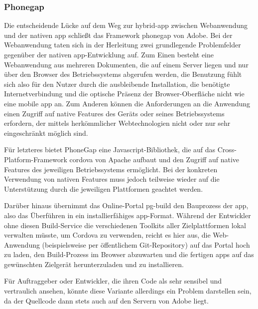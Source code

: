 \subsubsection{Phonegap}
Die entscheidende Lücke auf dem Weg zur \gls{hybrid-app} zwischen Webanwendung und der nativen \gls{app} schließt das Framework \gls{phonegap} von Adobe. 
Bei der Webanwendung taten sich in der Herleitung zwei grundlegende Problemfelder gegenüber der nativen \gls{app}-Entwicklung auf. 
Zum Einen besteht eine Webanwendung aus mehreren Dokumenten, die auf einem Server liegen und nur über den Browser des Betriebssystems abgerufen werden, die Benutzung fühlt sich also für den Nutzer durch die ausbleibende Installation, die benötigte Internetverbindung und die optische Präsenz der Browser-Oberfläche nicht wie eine mobile \gls{app} an. 
Zum Anderen können die Anforderungen an die Anwendung einen Zugriff auf native Features des Geräts oder seines Betriebssystems erfordern, der mittels herkömmlicher Webtechnologien nicht oder nur sehr eingeschränkt möglich sind. 

Für letzteres bietet PhoneGap eine Javascript-Bibliothek, die auf das Cross-Platform-Framework \gls{cordova} von Apache aufbaut und den Zugriff auf native Features des jeweiligen Betriebssystems ermöglicht. 
Bei der konkreten Verwendung von nativen Features muss jedoch teilweise wieder auf die Unterstützung durch die jeweiligen Plattformen geachtet werden. 

Darüber hinaus übernimmt das Online-Portal \gls{pg-build} den Bauprozess der \gls{app}, also das Überführen in ein installierfähiges \gls{app}-Format. 
Während der Entwickler ohne diesen Build-Service die verschiedenen Toolkits aller Zielplattformen lokal verwalten müsste, um Cordova zu verwenden,\cite{phonegap-doc-cordova} reicht es hier aus, die Web-Anwendung (beispielsweise per öffentlichem Git-Repository) auf das Portal hoch zu laden, den Build-Prozess im Browser abzuwarten und die fertigen \glspl{app} auf das gewünschten Zielgerät herunterzuladen und zu installieren. 

Für Auftraggeber oder Entwickler, die ihren Code als sehr sensibel und vertraulich ansehen, könnte diese Variante allerdings ein Problem darstellen sein, da der Quellcode dann stets auch auf den Servern von Adobe liegt.

